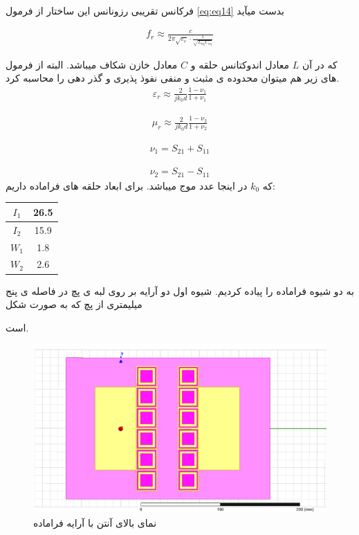 فرکانس تقریبی رزونانس این ساختار از فرمول 
\eqref{eq:eq14}
 بدست میآید

\begin{align}
	\label{eq:eq14}
	f_r \approx \frac{c}{2\pi\sqrt{\varepsilon_{e}} \cdot \frac{1}{\sqrt{L_{\text{eq}}C_{\text{eq}}}}}
\end{align}

که در آن
$L$
 معادل اندوکتانس حلقه و
 $ C $
 معادل خازن شکاف میباشد. البته از فرمول های زیر هم میتوان محدوده ی مثبت و منفی نفوذ پذیری و گذر دهی را محاسبه کرد.
\begin{align}
	\label{eq:eq15}
	\varepsilon_r \approx \frac{2}{jk_0d}\frac{1-\nu_1}{1+\nu_1}
\end{align}

\begin{align}
	\label{eq:eq15}
	\mu_r \approx \frac{2}{jk_0d}\frac{1-\nu_2}{1+\nu_2}
\end{align}

\begin{align}
	\label{eq:eq15}
	\nu_1=S_{21}+S_{11}
\end{align}


\begin{align}
	\label{eq:eq15}
	\nu_2=S_{21}-S_{11}
\end{align}
که
$ k_0$
 در اینجا عدد موج میباشد.
برای ابعاد حلقه های فراماده داریم:
 \begin{center}
	\begin{tabular}{|c|c|}
		\hline
		$I_1$ & 26.5 \\
		\hline
		$I_2$ & 15.9 \\
		\hline
		$W_1$ & 1.8 \\
		\hline
		$W_2$ & 2.6 \\
		\hline
	\end{tabular}
\end{center}

به دو شیوه فراماده را پیاده کردیم. شیوه اول دو آرایه بر روی لبه ی پچ در فاصله ی پنج میلیمتری از پچ که به صورت شکل

است.
\begin{figure}
	\centering
	\includegraphics[scale=0.5]{Images/fig38.png}
	\caption{نمای بالای آنتن با آرایه فراماده}
	\label{fig38}
\end{figure}

